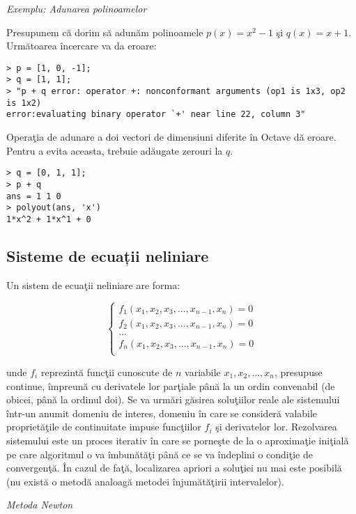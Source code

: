 \documentclass{exam}
\begin{document}
\textit{Exemplu: Adunarea polinoamelor}

Presupunem că dorim să adunăm polinoamele $p(x)=x^{2}-1$ şi $q(x)=x+1$. Următoarea încercare va da eroare:
\begin{verbatim}
> p = [1, 0, -1]; 
> q = [1, 1]; 
> "p + q error: operator +: nonconformant arguments (op1 is 1x3, op2 is 1x2)
error:evaluating binary operator `+' near line 22, column 3"
\end{verbatim}

Operaţia de adunare a doi vectori de dimensiuni diferite în Octave dă eroare. Pentru a evita aceasta, trebuie adăugate zerouri la $q$.
\begin{verbatim}
> q = [0, 1, 1]; 
> p + q 
ans = 1 1 0 
> polyout(ans, 'x') 
1*x^2 + 1*x^1 + 0
\end{verbatim}

\subsection{Sisteme de ecuații neliniare}
Un sistem de ecuaţii neliniare are forma:

$$\left\{
	\begin{array}{lll}
		f_{1}(x_{1},x_{2},x_{3},...,x_{n-1},x_{n})=0 \\
		f_{2}(x_{1},x_{2},x_{3},...,x_{n-1},x_{n})=0 \\
		...                                          \\
		f_{n}(x_{1},x_{2},x_{3},...,x_{n-1},x_{n})=0 \\
	\end{array}
	\right.$$

\noindent  unde $f_{i}$ reprezintă funcţii cunoscute de $n$ variabile $x_{1}, x_{2}, ..., x_{n}$, presupuse continue, împreună cu derivatele lor parţiale până la un ordin convenabil (de obicei, până la ordinul doi). Se va urmări găsirea soluţiilor reale ale sistemului într-un anumit domeniu de interes, domeniu în care se consideră valabile proprietăţile de continuitate impuse funcţiilor $f_{i}$ şi derivatelor lor. Rezolvarea sistemului este un proces iterativ în care se porneşte de la o aproximaţie iniţială pe care algoritmul o va îmbunătăţi până ce se va îndeplini o condiţie de convergenţă. În cazul de faţă, localizarea apriori a soluţiei nu mai este posibilă (nu există o metodă analoagă metodei înjumătăţirii intervalelor).

\textit{Metoda Newton}
\end{document}
